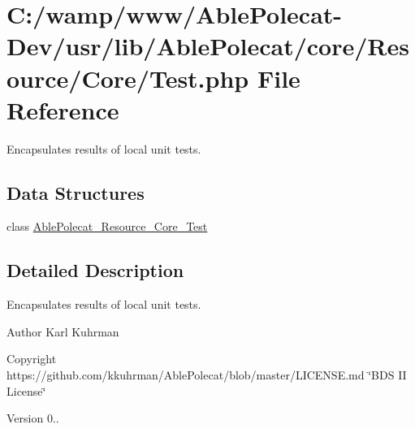\hypertarget{_resource_2_core_2_test_8php}{}\section{C\+:/wamp/www/\+Able\+Polecat-\/\+Dev/usr/lib/\+Able\+Polecat/core/\+Resource/\+Core/\+Test.php File Reference}
\label{_resource_2_core_2_test_8php}


Encapsulates results of local unit tests.  


\subsection*{Data Structures}
\begin{DoxyCompactItemize}
\item 
class \hyperlink{class_able_polecat___resource___core___test}{Able\+Polecat\+\_\+\+Resource\+\_\+\+Core\+\_\+\+Test}
\end{DoxyCompactItemize}


\subsection{Detailed Description}
Encapsulates results of local unit tests. 

\begin{DoxyAuthor}{Author}
Karl Kuhrman 
\end{DoxyAuthor}
\begin{DoxyCopyright}{Copyright}
https\+://github.com/kkuhrman/\+Able\+Polecat/blob/master/\+L\+I\+C\+E\+N\+S\+E.\+md \char`\"{}\+B\+D\+S I\+I License\char`\"{} 
\end{DoxyCopyright}
\begin{DoxyVersion}{Version}
0.. 
\end{DoxyVersion}
